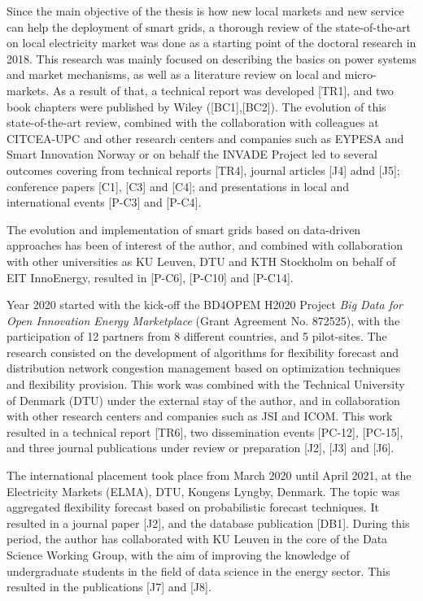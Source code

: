 Since the main objective of the thesis is how new local markets and new service can help the deployment of smart grids, a thorough review of the state-of-the-art on local electricity market was done as a starting point of the doctoral research in 2018. This research was mainly focused on describing the basics on power systems and market mechanisms, as well as a literature review on local and micro-markets. As a result of that, a technical report was developed [TR1], and two book chapters were published by Wiley ([BC1],[BC2]).  The evolution of this state-of-the-art review, combined with the collaboration with colleagues at CITCEA-UPC and other research centers and companies such as EYPESA and Smart Innovation Norway or on behalf the INVADE Project led to several outcomes covering from technical reports [TR4], journal articles [J4] adnd [J5]; conference papers [C1], [C3] and [C4]; and presentations in local and international events [P-C3] and [P-C4].  

The evolution and implementation of smart grids based on data-driven approaches has been of interest of the author, and combined with collaboration with other universities as KU Leuven, DTU and KTH Stockholm on behalf of EIT InnoEnergy, resulted in [P-C6], [P-C10] and [P-C14]. 

Year 2020 started with the kick-off the BD4OPEM H2020 Project \textit{Big Data for Open Innovation Energy Marketplace} (Grant Agreement No. 872525), with the participation of 12 partners from 8 different countries, and 5 pilot-sites. The research consisted on the development of algorithms for flexibility forecast and distribution network congestion management based on optimization techniques and flexibility provision. This work was combined with the Technical University of Denmark (DTU) under the external stay of the author, and in collaboration with other research centers and companies such as JSI and ICOM. This work resulted in a technical report [TR6], two dissemination events [PC-12], [PC-15], and three journal publications under review or preparation [J2], [J3] and [J6].  

The international placement took place from March 2020 until April 2021, at the Electricity Markets (ELMA), DTU, Kongens Lyngby, Denmark. The topic was aggregated flexibility forecast based on probabilistic forecast techniques. It resulted in a journal paper [J2], and the database publication [DB1]. During this period, the author has collaborated with KU Leuven in the core of the Data Science Working Group, with the aim of improving the knowledge of undergraduate students in the field of data science in the energy sector. This resulted in the publications [J7] and [J8]. 

